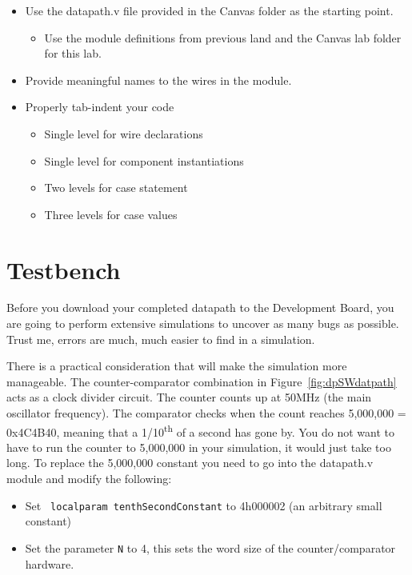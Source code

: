 \begin{itemize}
    \item
        Use the datapath.v file provided in the Canvas folder as the starting
        point.

        \begin{itemize}
            \item
                Use the module definitions from previous land and the Canvas lab
                folder for this lab.
        \end{itemize}
    \item
        Provide meaningful names to the wires in the module.
    \item
        Properly tab-indent your code

        \begin{itemize}
            \item
                Single level for wire declarations
            \item
                Single level for component instantiations
            \item
                Two levels for case statement
            \item
                Three levels for case values
        \end{itemize}
\end{itemize}

\section{Testbench}

Before you download your completed datapath to the Development Board,
you are going to perform extensive simulations to uncover as many bugs
as possible. Trust me, errors are much, much easier to find in a
simulation.

There is a practical consideration that will make the simulation more
manageable. The counter-comparator combination in Figure~\ref{fig:dpSWdatpath} acts as a
clock divider circuit. The counter counts up at 50MHz (the main
oscillator frequency). The comparator checks when the count reaches
5,000,000 = 0x4C4B40, meaning that a 1/10\textsuperscript{th} of a
second has gone by. You do not want to have to run the counter to
5,000,000 in your simulation, it would just take too long. To replace
the 5,000,000 constant you need to go into the datapath.v module and
modify the following:

\begin{itemize}
    \item
        Set \verb+ localparam tenthSecondConstant+ to 4\textquotesingle h000002
        (an arbitrary small constant)
    \item
        Set the parameter \verb+N+ to 4, this sets the word size of the counter/comparator hardware.
\end{itemize}


